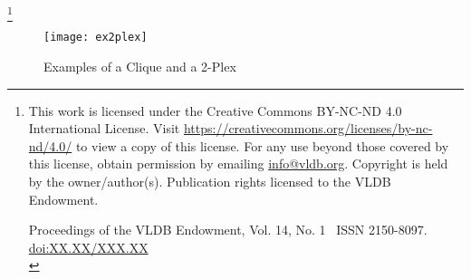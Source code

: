 \documentclass[sigconf, nonacm]{acmart}
\newcommand\vldbdoi{XX.XX/XXX.XX}
\newcommand\vldbpages{XXX-XXX}
\newcommand\vldbvolume{14}
\newcommand\vldbissue{1}
\newcommand\vldbyear{2024}
\newcommand\vldbauthors{\authors}
\newcommand\vldbtitle{\shorttitle}
\newcommand\vldbavailabilityurl{https://github.com/akhlaqueak/MKP-Study}
\newcommand\vldbpagestyle{plain}
\begin{document}


\maketitle

\pagestyle{\vldbpagestyle}
\begingroup
\renewcommand\thefootnote{}\footnote{\noindent
This work is licensed under the Creative Commons BY-NC-ND 4.0 International License. Visit \url{https://creativecommons.org/licenses/by-nc-nd/4.0/} to view a copy of this license. For any use beyond those covered by this license, obtain permission by emailing \href{mailto:info@vldb.org}{info@vldb.org}. Copyright is held by the owner/author(s). Publication rights licensed to the VLDB Endowment. \\
\raggedright Proceedings of the VLDB Endowment, Vol. \vldbvolume, No. \vldbissue\ %
ISSN 2150-8097. \\
\href{https://doi.org/\vldbdoi}{doi:\vldbdoi} \\
}\addtocounter{footnote}{-1}\endgroup



\begin{figure}[t]
  \texttt{[image: ex2plex]}
  \vspace{-3mm}
  \caption{Examples of a Clique and a 2-Plex}\label{fig:ex2plex}
  \vspace{-6mm}
\end{figure}

\vspace{-5mm}
\end{document}
